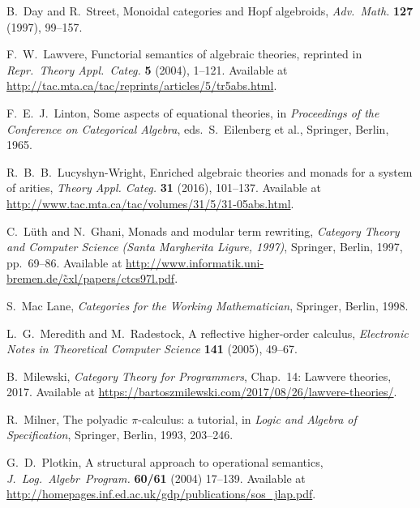 \documentclass{amsart}
\theoremstyle{definition}
\begin{document}
\begin{thebibliography}{100}
 B.\ Day and R.\ Street, Monoidal categories and Hopf algebroids,
\textsl{Adv.\ Math.} \textbf{127} (1997), 99--157.

 F.\ W.\ Lawvere, Functorial semantics of algebraic theories, reprinted in
\textsl{Repr.\ Theory Appl.\ Categ.} \textbf{5} (2004), 1--121.  Available at \href{http://tac.mta.ca/tac/reprints/articles/5/tr5abs.html}{http://tac.mta.ca/tac/reprints/articles/5/tr5abs.html}.

 F.\ E.\ J.\ Linton, Some aspects of equational theories, in 
\textsl{Proceedings of the Conference on Categorical Algebra}, eds.\ S.\ Eilenberg et al.,
Springer, Berlin, 1965.

 R.\ B.\ B.\ Lucyshyn-Wright, Enriched algebraic theories and monads for a system of
arities, \textsl{Theory Appl. Categ.} \textbf{31} (2016), 101--137.  Available at \href{http://www.tac.mta.ca/tac/volumes/31/5/31-05abs.html}{http://www.tac.mta.ca/tac/volumes/31/5/31-05abs.html}.
	
 C.\ L\"{u}th and N.\ Ghani, Monads and modular term rewriting,
\textsl{Category Theory and Computer Science ({S}anta {M}argherita Ligure, 1997)}, Springer,
Berlin, 1997, pp.\ 69--86.  Available at \href{http://www.informatik.uni-bremen.de/~cxl/papers/ctcs97l.pdf}{http://www.informatik.uni-bremen.de/\~cxl/papers/ctcs97l.pdf}.

 S.\ Mac Lane, \textsl{Categories for the Working Mathematician}, Springer,
Berlin, 1998.  
    
 L.\ G.\ Meredith and M.\ Radestock, A reflective higher-order calculus,
\textsl{Electronic Notes in Theoretical Computer Science} \textbf{141} (2005), 49--67.

 B.\ Milewski, \textsl{Category Theory for Programmers}, Chap.\ 14: Lawvere theories, 2017.   Available at \href{https://bartoszmilewski.com/2017/08/26/lawvere-theories/}{https://bartoszmilewski.com/2017/08/26/lawvere-theories/}.

 R.\ Milner, The polyadic {$\pi$}-calculus: a tutorial, in \textsl{Logic and Algebra of Specification}, Springer, Berlin, 1993, 203--246.

 G.\ D.\ Plotkin, A structural approach to operational semantics, \textsl{J.\ Log.\ Algebr\ Program.} \textbf{60/61} (2004) 17--139.  Available at \href{http://homepages.inf.ed.ac.uk/gdp/publications/sos_jlap.pdf}{http://homepages.inf.ed.ac.uk/gdp/publications/sos\_jlap.pdf}.


\end{thebibliography}
\end{document}

